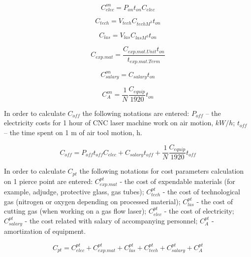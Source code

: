 \documentclass[runningheads]{llncs}
\begin{document}
\begin{equation}
\label{eq1.4}
C^{on}_{elec} = P_{on} t_{on} C_{elec}
\end{equation}

\begin{equation}
  \label{eq1.5}
  C_{tech} = V_{tech} C_{tech M^3} t_{on}
\end{equation}

\begin{equation}
  \label{eq1.6}
  C_{las} = V_{las} C_{las M^3} t_{on}
\end{equation}

\begin{equation}
  \label{eq1.7}
  C_{exp.mat} = \frac{C_{exp.mat.Unit} t_{on}}{t_{exp.mat.Term}}
\end{equation}

\begin{equation}
  \label{eq1.8}
  C^{on}_{salary} = C_{salary} t_{on}
\end{equation}

\begin{equation}
  \label{eq1.9}
  C^{on}_A = \frac{1}N \frac{C_{equip}}{1920} t_{on}
\end{equation}

In order to calculate $C_{off}$
the following notations are entered:
$P_{off}$ – the electricity costs for 1 hour of CNC laser machine work on air motion, $kW/h$;
$t_{off}$ – the time spent on 1 m of air tool motion, h.

\begin{equation}
  \label{eq1.10}
  C_{off}
  = P_{off} t_{off} C_{elec}
  + C_{salary} t_{off}
  + \frac{1}N \frac{C_{equip}}{1920} t_{off}
\end{equation}

In order to calculate $C_{pt}$
the following notations for cost parameters calculation on 1 pierce point are entered:
$C^{pt}_{exp.mat}$ - the cost of expendable materials
(for example, adjudge, protective glass, gas tubes);
$C^{pt}_{tech}$ - the cost of technological gas
(nitrogen or oxygen depending on processed material);
$C^{pt}_{las}$ - the cost of cutting gas
(when working on a gas flow laser);
$C^{pt}_{elec}$ - the cost of electricity;
$C^{pt}_{salary}$ - the cost related with salary of accompanying personnel;
$C^{pt}_A$ - amortization of equipment.

\begin{equation}
  \label{eq1.11}
  C_{pt}
  = C^{pt}_{elec}
  + C^{pt}_{exp.mat}
  + C^{pt}_{las}
  + C^{pt}_{tech}
  + C^{pt}_{salary}
  + C^{pt}_A
\end{equation}
\end{document}
